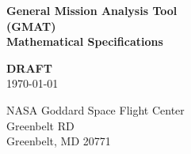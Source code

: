 
\begin{center}
{\renewcommand{\thefootnote}{\fnsymbol{footnote}} { \Huge \bf
General Mission Analysis Tool\\ (GMAT)\\ Mathematical Specifications
}}
\end{center}
\begin{center}
{\renewcommand{\thefootnote}{\fnsymbol{footnote}} { \Huge \bf
 DRAFT }}\\\vspace{.1 in}
 \today
\end{center}

\vspace{-.5 in}
\begin{center}
\Large{NASA Goddard Space Flight Center\\
Greenbelt RD\\
Greenbelt, MD 20771}
\end{center}

\clearpage \clearpage
